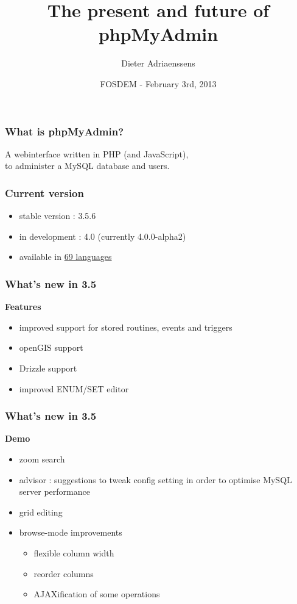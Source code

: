 \documentclass[14pt]{beamer}
\title{The present and future of phpMyAdmin}
\author{Dieter Adriaenssens}
\institute[phpMyAdmin]{phpMyAdmin developer - ruleant@users.sf.net}
\date[FOSDEM - 3Feb2013]{FOSDEM - February 3rd, 2013}
\begin{document}
  \begin{frame}
  \titlepage
  \end{frame}
  \begin{frame}
    \frametitle{What is phpMyAdmin?}
      A webinterface written in PHP (and JavaScript),\\
      to administer a MySQL database and users.
  \end{frame}
  \begin{frame}
    \frametitle{Current version}
    \begin{itemize}[<+->]
      \item stable version : 3.5.6
      \item in development : 4.0 (currently 4.0.0-alpha2)
      \item available in \href{http://www.phpmyadmin.net/home\_page/translations.php}{69 languages}
    \end{itemize}
  \end{frame}
  \begin{frame}
    \frametitle{What's new in 3.5}
   \textbf{{\color{PmaOlive}Features}}
    \pause
    \begin{itemize}[<+->]
      \item improved support for stored routines, events and triggers
      \item openGIS support
      \item Drizzle support
      \item improved ENUM/SET editor
    \end{itemize}
  \end{frame}
  \begin{frame}
    \frametitle{What's new in 3.5}
    \textbf{{\color{PmaOlive}Demo}}
    \begin{itemize}
      \item zoom search
      \item advisor : suggestions to tweak config setting in order to optimise MySQL server performance
      \item grid editing
      \item browse-mode improvements
      \begin{itemize}
        \item flexible column width
        \item reorder columns
        \item AJAXification of some operations
      \end{itemize}
    \end{itemize}
  \end{frame}
\end{document}

